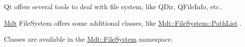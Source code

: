 Qt offers several tools to deal with file system, like Q\+Dir, Q\+File\+Info, etc..

\hyperlink{namespace_mdt}{Mdt} File\+System offers some additional classes, like \hyperlink{class_mdt_1_1_file_system_1_1_path_list}{Mdt\+::\+File\+System\+::\+Path\+List} .

Classes are available in the \hyperlink{namespace_mdt_1_1_file_system}{Mdt\+::\+File\+System} namespace. 